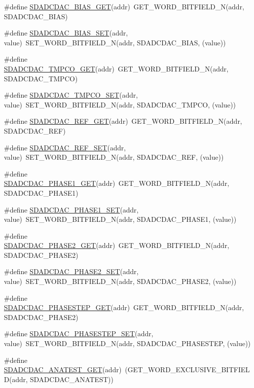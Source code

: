 \begin{DoxyCompactItemize}
\#define \hyperlink{a00568_a78e4742272404aa57b160f3c87fb8a4c}{SDADCDAC\_\-BIAS\_\-GET}(addr)~GET\_\-WORD\_\-BITFIELD\_\-N(addr, SDADCDAC\_\-BIAS)
\item 
\#define \hyperlink{a00568_adad1aa22736433f25608f989f6295c2f}{SDADCDAC\_\-BIAS\_\-SET}(addr, value)~SET\_\-WORD\_\-BITFIELD\_\-N(addr, SDADCDAC\_\-BIAS, (value))
\item 
\#define \hyperlink{a00568_aaa8bec53631675c1b1c7dce20277f38a}{SDADCDAC\_\-TMPCO\_\-GET}(addr)~GET\_\-WORD\_\-BITFIELD\_\-N(addr, SDADCDAC\_\-TMPCO)
\item 
\#define \hyperlink{a00568_acf4d8e94ba9b93890d425428a16c5c91}{SDADCDAC\_\-TMPCO\_\-SET}(addr, value)~SET\_\-WORD\_\-BITFIELD\_\-N(addr, SDADCDAC\_\-TMPCO, (value))
\item 
\#define \hyperlink{a00568_a42c62441c844149f8bf8df9372bcf453}{SDADCDAC\_\-REF\_\-GET}(addr)~GET\_\-WORD\_\-BITFIELD\_\-N(addr, SDADCDAC\_\-REF)
\item 
\#define \hyperlink{a00568_aba0e73228ee6cca7b12e1c4170e7e51d}{SDADCDAC\_\-REF\_\-SET}(addr, value)~SET\_\-WORD\_\-BITFIELD\_\-N(addr, SDADCDAC\_\-REF, (value))
\item 
\#define \hyperlink{a00568_a82c24e117aaf062d9066f5ab8d73aadd}{SDADCDAC\_\-PHASE1\_\-GET}(addr)~GET\_\-WORD\_\-BITFIELD\_\-N(addr, SDADCDAC\_\-PHASE1)
\item 
\#define \hyperlink{a00568_aec17b61376d276ca5a7263fc8ec3331b}{SDADCDAC\_\-PHASE1\_\-SET}(addr, value)~SET\_\-WORD\_\-BITFIELD\_\-N(addr, SDADCDAC\_\-PHASE1, (value))
\item 
\#define \hyperlink{a00568_a32310539f3627d9a537056eb3923fbcd}{SDADCDAC\_\-PHASE2\_\-GET}(addr)~GET\_\-WORD\_\-BITFIELD\_\-N(addr, SDADCDAC\_\-PHASE2)
\item 
\#define \hyperlink{a00568_a7f44b2eee94c6afcada697b91c0de32c}{SDADCDAC\_\-PHASE2\_\-SET}(addr, value)~SET\_\-WORD\_\-BITFIELD\_\-N(addr, SDADCDAC\_\-PHASE2, (value))
\item 
\#define \hyperlink{a00568_ad01fbf62e1e40c87c3b0cc7176ea4884}{SDADCDAC\_\-PHASESTEP\_\-GET}(addr)~GET\_\-WORD\_\-BITFIELD\_\-N(addr, SDADCDAC\_\-PHASE2)
\item 
\#define \hyperlink{a00568_ae944b18d5567083c689979493740e06b}{SDADCDAC\_\-PHASESTEP\_\-SET}(addr, value)~SET\_\-WORD\_\-BITFIELD\_\-N(addr, SDADCDAC\_\-PHASESTEP, (value))
\item 
\#define \hyperlink{a00568_a9545ba79eb6343bfed7c112b498bd1d3}{SDADCDAC\_\-ANATEST\_\-GET}(addr)~(GET\_\-WORD\_\-EXCLUSIVE\_\-BITFIELD(addr, SDADCDAC\_\-ANATEST))

\end{DoxyCompactItemize}
